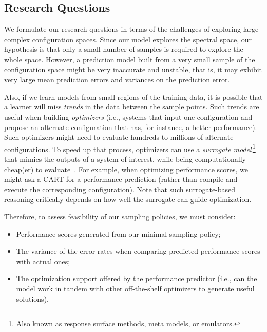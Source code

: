 \documentclass{newsig}
\begin{document}
\subsection{Research Questions} 

We formulate our research questions in terms of the challenges of
exploring large complex configuration spaces.
Since our model explores the spectral space, our hypothesis is that only a small
number of samples is required to explore the whole space.
However, a prediction model built from a very small sample of the configuration space might
be very inaccurate and unstable, that is, it may exhibit very large mean prediction errors and variances on the prediction error.

Also, if we learn models from small regions of the training data,
it is  possible that a learner will miss {\em trends} in the data
between the sample points. Such trends are useful when building {\em optimizers}
(i.e., systems that input one configuration and propose an alternate
configuration that has, for instance,  a better performance). Such optimizers might
need to evaluate hundreds to millions of alternate configurations. 
To speed up that process, optimizers can use a {\em surrogate model}\,\footnote{Also known as response surface methods, meta models, or emulators.}
that  mimics the outputs of a system of interest, while being computationally cheap(er) to evaluate~\cite{loshchilov13}. For example, when optimizing
performance scores, we might ask a CART  for a performance
prediction (rather than compile and execute
the corresponding configuration).  Note that such surrogate-based
reasoning critically depends on how well the surrogate can guide optimization.


Therefore, to assess feasibility of our sampling policies, we must consider:
\begin{itemize}
\item Performance scores generated from our minimal sampling policy;
\item The variance of the error rates when comparing predicted performance scores with actual ones;
\item The optimization support offered by the performance predictor (i.e., can the model work in tandem with other off-the-shelf optimizers to generate useful solutions).
\end{itemize}
\end{document}
